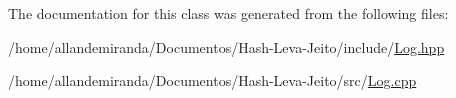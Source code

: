 The documentation for this class was generated from the following files\+:\begin{DoxyCompactItemize}
\item 
/home/allandemiranda/\+Documentos/\+Hash-\/\+Leva-\/\+Jeito/include/\hyperlink{_log_8hpp}{Log.\+hpp}\item 
/home/allandemiranda/\+Documentos/\+Hash-\/\+Leva-\/\+Jeito/src/\hyperlink{_log_8cpp}{Log.\+cpp}\end{DoxyCompactItemize}
